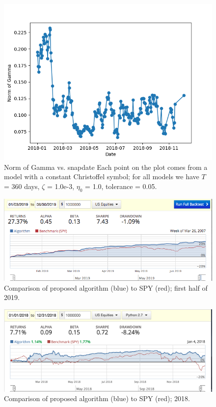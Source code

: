 \documentclass{article}
\begin{document}
\begin{figure}
\includegraphics[scale=0.9,bb=0 0 640 480]{figures/Gamma_time_2018.png}
\caption{Norm of Gamma vs. snapdate Each point on the plot comes from
  a model with a constant Christoffel symbol; for all models we have
  $T$ = 360 days, $\zeta$ = 1.0e-3, $\eta_{0}$ = 1.0, tolerance =
  0.05.}
\label{fig:gamma-time}
\end{figure}

\begin{figure}
\includegraphics[scale=0.5,bb=0 0 640 480]{figures/2019_half_mfd_macd.png}
\caption{Comparison of proposed algorithm (blue) to SPY (red); first
  half of 2019.}
\label{fig:backtest-2019-half}
\end{figure}

\begin{figure}
\includegraphics[scale=0.5,bb=0 0 640 480]{figures/mad_mfd_macd_2018.png}
\caption{Comparison of proposed algorithm (blue) to SPY (red); 2018.}
\label{fig:backtest-2018}
\end{figure}
\end{document}

